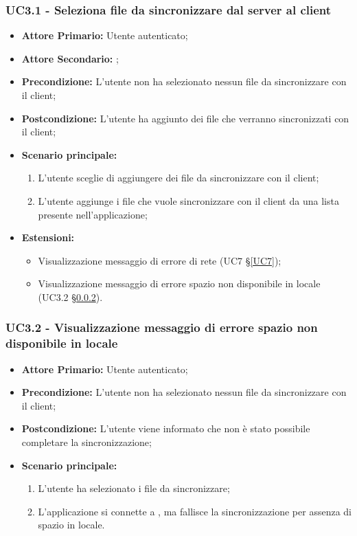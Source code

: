\subsubsection{UC3.1 - Seleziona file da sincronizzare dal server al client}
\begin{itemize}
\item \textbf{Attore Primario:} Utente autenticato;
\item \textbf{Attore Secondario:} ;
\item \textbf{Precondizione:} L'utente non ha selezionato nessun file da sincronizzare con il client;
\item \textbf{Postcondizione:} L'utente ha aggiunto dei file che verranno sincronizzati con il client;
\item \textbf{Scenario principale:}
    \begin{enumerate}
    \item L'utente sceglie di aggiungere dei file da sincronizzare con il client;
    \item L'utente aggiunge i file che vuole sincronizzare con il client da una lista presente nell'applicazione;
    \end{enumerate}
\item \textbf{Estensioni:}
    \begin{itemize}
    \item Visualizzazione messaggio di errore di rete (UC7 \S{}\ref{UC7});
    \item Visualizzazione messaggio di errore spazio non disponibile in locale (UC3.2 \S{}\ref{UC3.2}).
    \end{itemize}
\end{itemize}
\subsubsection{UC3.2 - Visualizzazione messaggio di errore spazio non disponibile in locale}
\label{UC3.2}
\begin{itemize}
\item \textbf{Attore Primario:} Utente autenticato;
\item \textbf{Precondizione:} L'utente non ha selezionato nessun file da sincronizzare con il client;
\item \textbf{Postcondizione:} L'utente viene informato che non è stato possibile completare la sincronizzazione;
\item \textbf{Scenario principale:}
    \begin{enumerate}
    \item L'utente ha selezionato i file da sincronizzare;
    \item L'applicazione si connette a , ma fallisce la sincronizzazione per assenza di spazio in locale.
    \end{enumerate}
\end{itemize}